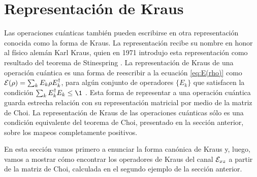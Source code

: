 \section{Representación de Kraus} %

Las operaciones cuánticas también pueden escribirse
en otra representación conocida como la forma de Kraus.
La representación recibe su nombre en honor al físico alemán Karl Kraus,
quien en 1971 introdujo esta representación como resultado
del teorema de Stinespring \cite{bengtsson_zyczkowski_2017}.
La representación de Kraus de una operación cuántica es una forma
de reescribir a la ecuación \eqref{eq:E(rho)} como
$\mathcal{E}\qty(\rho)=\sum_k E_k\rho E_k^{\dagger}$,
para algún conjunto de operadores $\{E_k\}$ 
que satisfacen la condición $\sum _kE_k^{\dagger}E_k\leq\1$
\cite{nielsen_chuang_2011}. Esta forma de representar a una
operación cuántica guarda estrecha relación con 
su representación matricial por medio de la matriz de Choi. 
La representación de Kraus de las operaciones cuánticas sólo
es una condición equivalente del teorema de Choi,
presentado en la sección anterior, sobre los mapeos 
completamente positivos.

En esta sección vamos primero a enunciar la forma canónica
de Kraus y, luego, vamos a mostrar cómo encontrar los 
operadores de Kraus del canal $\mathcal{E}_{xz}$ a partir de la 
matriz de Choi, calculada en el segundo ejemplo de la 
sección anterior.

